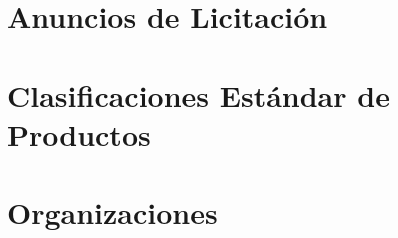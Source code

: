 \section{Anuncios de Licitación}\label{sect:rdf-anuncios}

\section{Clasificaciones Estándar de Productos}

\section{Organizaciones}\label{sect:rdf-orgs}



